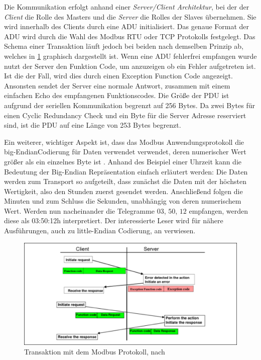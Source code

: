 Die Kommunikation erfolgt anhand einer \textit{Server/Client Architektur}, bei der der \textit{Client} die Rolle des Masters und die \textit{Server} die Rolles der Slaves übernehmen. Sie wird innerhalb des Clients durch eine ADU initialisiert. Das genaue Format der ADU wird durch die Wahl des Modbus RTU oder TCP Protokolls festgelegt. Das Schema einer Transaktion läuft jedoch bei beiden nach demselben Prinzip ab, welches in \ref{fig:modbustransaktion} graphisch dargestellt ist.
Wenn eine ADU fehlerfrei empfangen wurde nutzt der Server den Funktion Code, um anzuzeigen ob ein Fehler aufgetreten ist. Ist die der Fall, wird dies durch einen Exception Function Code angezeigt. Ansonsten sendet der Server eine normale Antwort, zusammen mit einem einfachen Echo des empfangenen Funktionscodes.
Die Größe der PDU ist aufgrund der seriellen Kommunikation begrenzt auf 256 Bytes. Da zwei Bytes für einen Cyclic Redundancy Check und ein Byte für die Server Adresse reserviert sind, ist die PDU auf eine Länge von 253 Bytes begrenzt.

Ein weiterer, wichtiger Aspekt ist, dass das Modbus Anwendungsprotokoll die \Gun big-Endian\Gob Codierung für Daten verwendet verwendet, deren numerischer Wert größer als ein einzelnes Byte ist \cite[S.~3ff.]{mod12}. 
Anhand des Beispiel einer Uhrzeit kann die Bedeutung der Big-Endian Repräsentation einfach erläutert werden: Die Daten werden zum Transport so aufgeteilt, dass zunächst die Daten mit der höchsten Wertigkeit, also den Stunden zuerst gesendet werden. Anschließend folgen die Minuten und zum Schluss die Sekunden, unabhängig von deren numerischem Wert. Werden nun nacheinander die Telegramme $03$, $50$, $12$ empfangen, werden diese als 03:50:12h interpretiert. Der interessierte Leser wird für nähere Ausführungen, auch zu little-Endian Codierung, an \cite{endian05} verwiesen.

\begin{figure}
\centering
\includegraphics[width=\textwidth]{abbildungen/20160319_modbusclientserver}
\caption[Transaktion mit dem Modbus Protokoll]{Transaktion mit dem Modbus Protokoll, nach \cite[S.~4]{mod12}}
\label{fig:modbustransaktion}
\end{figure}

